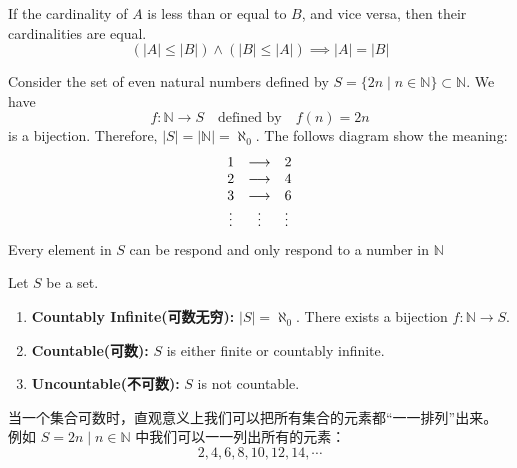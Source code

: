 \documentclass[
	UTF-8,
	11pt, %
	a4paper, %
]{LegrandOrangeBook}
\begin{document}
    \begin{theorem}
    If the cardinality of $A$ is less than or equal to $B$, and vice versa, then their cardinalities are equal.
    \[ (|A| \le |B|) \land (|B| \le |A|) \implies |A| = |B| \]
    \end{theorem}

    \begin{example}

    Consider the set of even natural numbers defined by $S = \{ 2n \mid n \in \mathbb{N} \} \subset \mathbb{N}$. 
    We have 
    \[ f: \mathbb{N} \to S \quad \text{defined by} \quad f(n) = 2n \]
    is a bijection. Therefore, $|S| = |\mathbb{N}| = \aleph_0$. The follows diagram show the meaning:
    $$
    \begin{array}{c c l}
        1 & \longrightarrow & 2\\
        2 & \longrightarrow & 4\\
        3 & \longrightarrow & 6\\
        \vdots&\vdots&\vdots 
    \end{array}
    $$
    Every element in $S$ can be respond and only respond to a number in $\mathbb{N}$
    \end{example}

    \newpage

    
    \begin{definition}[Countability]
    Let $S$ be a set.
    \begin{enumerate}
        \item \textbf{Countably Infinite(可数无穷):} $|S| = \aleph_0$. 
        There exists a bijection $f: \mathbb{N} \to S$.
        \item \textbf{Countable(可数):} $S$ is either finite or countably infinite.
        \item \textbf{Uncountable(不可数):} $S$ is not countable.
    \end{enumerate}
    \end{definition}

    \begin{remark}
        当一个集合可数时，直观意义上我们可以把所有集合的元素都“一一排列”出来。
        例如 $S={2n \mid n \in \mathbb{N}}$ 中我们可以一一列出所有的元素：
        $$ 2,4,6,8,10,12,14,\cdots $$
    \end{remark}
\end{document}

